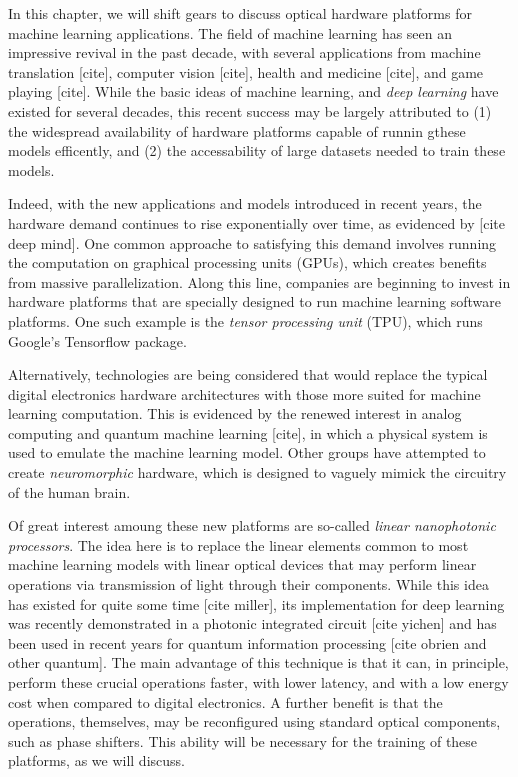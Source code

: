 
In this chapter, we will shift gears to discuss optical hardware platforms for machine learning applications.
The field of machine learning has seen an impressive revival in the past decade, with several applications from machine translation [cite], computer vision [cite], health and medicine [cite], and game playing [cite].
While the basic ideas of machine learning, and \textit{deep learning} have existed for several decades, this recent success may be largely attributed to (1) the widespread availability of hardware platforms capable of runnin gthese models efficently, and (2) the accessability of large datasets needed to train these models.

Indeed, with the new applications and models introduced in recent years, the hardware demand continues to rise exponentially over time, as evidenced by [cite deep mind].
One common approache to satisfying this demand involves running the computation on graphical processing units (GPUs), which creates benefits from massive parallelization.
Along this line, companies are beginning to invest in hardware platforms that are specially designed to run machine learning software platforms.
One such example is the \textit{tensor processing unit} (TPU), which runs Google's Tensorflow package.

Alternatively, technologies are being considered that would replace the typical digital electronics hardware architectures with those more suited for machine learning computation.
This is evidenced by the renewed interest in analog computing and quantum machine learning [cite], in which a physical system is used to emulate the machine learning model.
Other groups have attempted to create \textit{neuromorphic} hardware, which is designed to vaguely mimick the circuitry of the human brain.

Of great interest amoung these new platforms are so-called \textit{linear nanophotonic processors}.
The idea here is to replace the linear elements common to most machine learning models with linear optical devices that may perform linear operations via transmission of light through their components.
While this idea has existed for quite some time [cite miller], its implementation for deep learning was recently demonstrated in a photonic integrated circuit [cite yichen] and has been used in recent years for quantum information processing [cite obrien and other quantum].
The main advantage of this technique is that it can, in principle, perform these crucial operations faster, with lower latency, and with a low energy cost when compared to digital electronics.
A further benefit is that the operations, themselves, may be reconfigured using standard optical components, such as phase shifters.
This ability will be necessary for the training of these platforms, as we will discuss.

